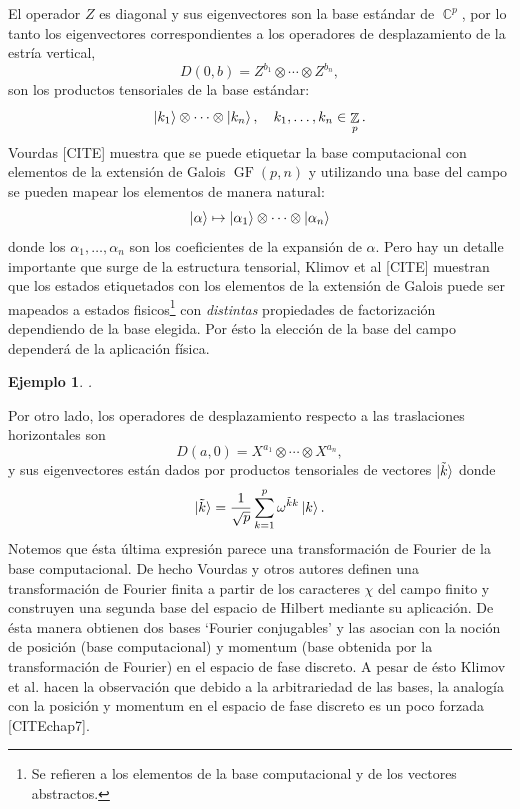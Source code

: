 \documentclass[a4paper]{report}
\DeclareMathOperator{\C}{\mathbb{C}}
\DeclareMathOperator{\Z}{\mathbb{Z}}
\DeclareMathOperator{\GF}{GF}
\newtheorem{example}{Ejemplo}
\begin{document}
  El operador $Z$ es diagonal y sus eigenvectores son la
  base estándar de $\C^{p}$, por lo tanto los eigenvectores
  correspondientes a los operadores de desplazamiento de la
  estría vertical, 
  \[
    D(0,b) = Z^{b_1} \otimes \cdots \otimes Z^{b_n},
  \] 
  son los productos tensoriales de la base estándar:
  \[
    \ket{k_1} \otimes \cdots \otimes \ket{k_n},
    \quad k_1,\ldots,k_n \in \Z_p.
  \] 
  Vourdas [CITE] muestra que se puede etiquetar la base
  computacional con elementos de la extensión de Galois
  $\GF(p,n)$ y utilizando una base del campo se pueden
  mapear los elementos de manera natural:
  \[
    \ket \alpha
    \mapsto \ket{\alpha_1} \otimes \cdots \otimes
    \ket{\alpha_n}
  \] 
  donde los $\alpha_1,\ldots,\alpha_n$ son los coeficientes
  de la expansión de $\alpha$. Pero hay un detalle
  importante que surge de la estructura tensorial, Klimov et
  al [CITE] muestran que los estados etiquetados con los
  elementos de la extensión de Galois puede ser mapeados a
  estados fisicos\footnote{Se refieren a los elementos de la
  base computacional y de los vectores abstractos.} con
  \textit{distintas} propiedades de factorización
  dependiendo de la base elegida. Por ésto la elección de la
  base del campo dependerá de la aplicación física.
  \begin{example}
    .
  \end{example}
  Por otro lado, los operadores de desplazamiento respecto a
  las traslaciones horizontales son
  \[
    D(a,0) = X^{a_1} \otimes \cdots \otimes X^{a_n},
  \] 
  y sus eigenvectores están dados por productos tensoriales
  de vectores $\ket{\tilde k}$ donde
  \[
    \ket{\tilde k}
    = \frac{1}{\sqrt{p}} \sum_{k=1}^{p}
    \omega^{\tilde k k} \ket k.
  \] 
  Notemos que ésta última expresión parece una
  transformación de Fourier de la base computacional. De
  hecho Vourdas y otros autores definen una transformación
  de Fourier finita a partir de los caracteres $\chi$ del
  campo finito y construyen una segunda base del espacio de
  Hilbert mediante su aplicación. De ésta manera obtienen
  dos bases `Fourier conjugables' y las asocian con la
  noción de posición (base computacional) y momentum (base
  obtenida por la transformación de Fourier) en el espacio
  de fase discreto. A pesar de ésto Klimov et al. hacen la
  observación que debido a la arbitrariedad de las bases, la
  analogía con la posición y momentum en el espacio de fase
  discreto es un poco forzada [CITEchap7].
\end{document}
